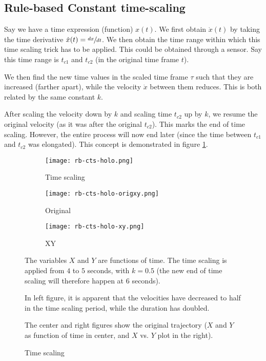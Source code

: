 
\subsection{Rule-based Constant time-scaling}

Say we have a time expression (function) $x(t)$. We first obtain $\dot{x}(t)$ by taking the time derivative $\dot{x}(t) = \sfrac{dx}{dt}$. 
We then obtain the time range within which this time scaling trick has to be applied. This could be obtained through a sensor. Say this time range is $t_{c1}$ and $t_{c2}$ (in the original time frame $t$).

We then find the new time values in the scaled time frame $\tau$ such that they are increased (farther apart), while the velocity $\dot{x}$ between them reduces. This is both related by the same constant $k$.

After scaling the velocity down by $k$ and scaling time $t_{c2}$ up by $k$, we resume the original velocity (as it was after the original $t_{c2}$). This marks the end of time scaling. However, the entire process will now end later (since the time between $t_{c1}$ and $t_{c2}$ was elongated). This concept is demonstrated in figure \ref{fig:cts-rb-holo}.

\begin{figure}[ht]
    \centering
    \begin{subfigure}[b]{0.4\textwidth}
        \texttt{[image: rb-cts-holo.png]}
        \caption{Time scaling}
    \end{subfigure}
    \begin{subfigure}[b]{0.3\textwidth}
        \texttt{[image: rb-cts-holo-origxy.png]}
        \caption{Original}
    \end{subfigure}
    \begin{subfigure}[b]{0.25\textwidth}
        \texttt{[image: rb-cts-holo-xy.png]}
        \caption{XY}
    \end{subfigure}
    \caption{Time scaling}
    \label{fig:cts-rb-holo}
    \small
        The variables $X$ and $Y$ are functions of time. The time scaling is applied from $4$ to $5$ seconds, with $k=0.5$ (the new end of time scaling will therefore happen at $6$ seconds).

        In left figure, it is apparent that the velocities have decreased to half in the time scaling period, while the duration has doubled.

        The center and right figures show the original trajectory ($X$ and $Y$ as function of time in center, and $X$ vs. $Y$ plot in the right).
\end{figure}

